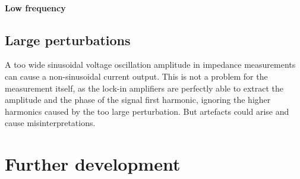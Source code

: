 \paragraph{Low frequency}



\subsection{Large perturbations}\label{impedance-large_perturbations}
A too wide sinusoidal voltage oscillation amplitude in impedance measurements can cause a non-sinusoidal current output.
This is not a problem for the measurement itself, as the lock-in amplifiers are perfectly able to extract the amplitude and the phase of the signal first harmonic, ignoring the higher harmonics caused by the too large perturbation.
But artefacts could arise and cause misinterpretations.



\section{Further development}


